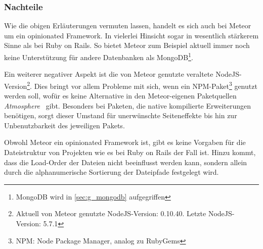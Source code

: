 \subsubsection{Nachteile}
\label{sssec:elm_nachteile}

Wie die obigen Erläuterungen vermuten lassen, handelt es sich auch bei
Meteor um ein opinionated Framework.  In vielerlei Hinsicht sogar in wesentlich
stärkerem Sinne als bei Ruby on Rails.  So bietet Meteor zum Beispiel aktuell
immer noch keine Unterstützung für andere Datenbanken als
MongoDB\footnote{MongoDB wird in \cref{sec:g_mongodb} aufgegriffen}.

Ein weiterer negativer Aspekt ist die von Meteor genutzte veraltete
NodeJS-Version\footnote{Aktuell von Meteor genutzte NodeJS-Version: 0.10.40.
Letzte NodeJS-Version: 5.7.1}.  Dies bringt vor allem Probleme mit sich, wenn
ein NPM-Paket\footnote{NPM: Node Package Manager, analog zu RubyGems} genutzt
werden soll, wofür es keine Alternative in den Meteor-eigenen Paketquellen
\emph{Atmosphere}~\cite{atmospherejs} gibt.  Besonders bei Paketen, die native
kompilierte Erweiterungen benötigen, sorgt dieser Umstand für unerwünschte
Seiteneffekte bis hin zur Unbenutzbarkeit des jeweiligen Pakets.

Obwohl Meteor ein opinionated Framework ist, gibt es keine Vorgaben für die
Dateistruktur von Projekten wie es bei Ruby on Rails der Fall ist.  Hinzu kommt,
dass die Load-Order der Dateien nicht beeinflusst werden kann, sondern allein
durch die alphanumerische Sortierung der Dateipfade festgelegt wird.
